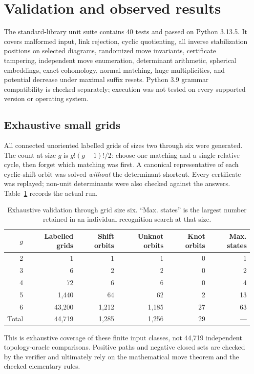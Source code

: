 \documentclass[11pt]{article}
\begin{document}
\section{Validation and observed results}
The standard-library unit suite contains 40 tests and passed on Python 3.13.5.
It covers malformed input, link rejection, cyclic quotienting, all inverse
stabilization positions on selected diagrams, randomized move invariants,
certificate tampering, independent move enumeration, determinant arithmetic,
spherical embeddings, exact cohomology, normal matching, huge multiplicities,
and potential decrease under maximal suffix resets. Python 3.9 grammar
compatibility is checked separately; execution was not tested on every
supported version or operating system.

\subsection{Exhaustive small grids}
All connected unoriented labelled grids of sizes two through six were generated.
The count at size $g$ is $g!(g-1)!/2$: choose one matching and a single relative
cycle, then forget which matching was first. A canonical representative of each
cyclic-shift orbit was solved \emph{without} the determinant shortcut. Every
certificate was replayed; non-unit determinants were also checked against the
answers. Table~\ref{tab:exhaustive} records the actual run.
\begin{table}[ht]
\centering
\begin{tabular}{rrrrrr}
\toprule
$g$ & Labelled grids & Shift orbits & Unknot orbits & Knot orbits & Max. states\\
\midrule
2 & 1 & 1 & 1 & 0 & 1\\
3 & 6 & 2 & 2 & 0 & 2\\
4 & 72 & 6 & 6 & 0 & 4\\
5 & 1,440 & 64 & 62 & 2 & 13\\
6 & 43,200 & 1,212 & 1,185 & 27 & 63\\
\midrule
Total & 44,719 & 1,285 & 1,256 & 29 & ---\\
\bottomrule
\end{tabular}
\caption{Exhaustive validation through grid size six. ``Max. states'' is the
largest number retained in an individual recognition search at that size.}
\label{tab:exhaustive}
\end{table}
This is exhaustive coverage of these finite input classes, not 44,719
independent topology-oracle comparisons. Positive paths and negative closed
sets are checked by the verifier and ultimately rely on the mathematical move
theorem and the checked elementary rules.
\end{document}
